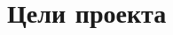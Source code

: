 \section{Цели проекта}

\begin{frame}
\frametitle{\insertsection} 
\framesubtitle{\insertsubsection}
\end{frame}